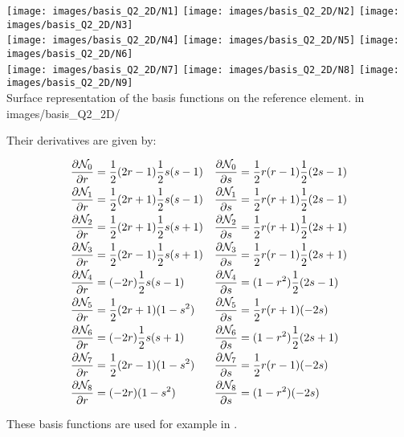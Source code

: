 \begin{center}
\texttt{[image: images/basis\_Q2\_2D/N1]}
\texttt{[image: images/basis\_Q2\_2D/N2]}
\texttt{[image: images/basis\_Q2\_2D/N3]}\\
\texttt{[image: images/basis\_Q2\_2D/N4]}
\texttt{[image: images/basis\_Q2\_2D/N5]}
\texttt{[image: images/basis\_Q2\_2D/N6]}\\
\texttt{[image: images/basis\_Q2\_2D/N7]}
\texttt{[image: images/basis\_Q2\_2D/N8]}
\texttt{[image: images/basis\_Q2\_2D/N9]}\\
{\captionfont Surface representation of the basis functions on the reference element.
{\color{gray} in images/basis\_Q2\_2D/ }}
\end{center}
Their derivatives are given by:
\begin{mdframed}[backgroundcolor=blue!5]
\begin{align}
\frac{\partial {\mathcal{N}}_0}{\partial r}&= \frac{1}{2}(2r-1)  \frac{1}{2}s(s-1) & 
\frac{\partial {\mathcal{N}}_0}{\partial s}&= \frac{1}{2}r(r-1)  \frac{1}{2}(2s-1)\nonumber\\
\frac{\partial {\mathcal{N}}_1}{\partial r}&= \frac{1}{2}(2r+1)  \frac{1}{2}s(s-1) &
\frac{\partial {\mathcal{N}}_1}{\partial s}&= \frac{1}{2}r(r+1)  \frac{1}{2}(2s-1)\nonumber\\
\frac{\partial {\mathcal{N}}_2}{\partial r}&= \frac{1}{2}(2r+1)  \frac{1}{2}s(s+1) &
\frac{\partial {\mathcal{N}}_2}{\partial s}&= \frac{1}{2}r(r+1)  \frac{1}{2}(2s+1)\nonumber\\
\frac{\partial {\mathcal{N}}_3}{\partial r}&= \frac{1}{2}(2r-1)  \frac{1}{2}s(s+1) &
\frac{\partial {\mathcal{N}}_3}{\partial s}&= \frac{1}{2}r(r-1)  \frac{1}{2}(2s+1)\nonumber\\
\frac{\partial {\mathcal{N}}_4}{\partial r}&=       (-2r)  \frac{1}{2}s(s-1) &
\frac{\partial {\mathcal{N}}_4}{\partial s}&=     (1-r^2)  \frac{1}{2}(2s-1)\nonumber\\
\frac{\partial {\mathcal{N}}_5}{\partial r}&= \frac{1}{2}(2r+1)     (1-s^2)&
\frac{\partial {\mathcal{N}}_5}{\partial s}&= \frac{1}{2}r(r+1)        (-2s)\nonumber\\
\frac{\partial {\mathcal{N}}_6}{\partial r}&=       (-2r)  \frac{1}{2}s(s+1)&
\frac{\partial {\mathcal{N}}_6}{\partial s}&=     (1-r^2)  \frac{1}{2}(2s+1)\nonumber\\
\frac{\partial {\mathcal{N}}_7}{\partial r}&= \frac{1}{2}(2r-1)     (1-s^2)&
\frac{\partial {\mathcal{N}}_7}{\partial s}&= \frac{1}{2}r(r-1)        (-2s)\nonumber\\
\frac{\partial {\mathcal{N}}_8}{\partial r}&=       (-2r)     (1-s^2)&
\frac{\partial {\mathcal{N}}_8}{\partial s}&=     (1-r^2)        (-2s)\nonumber
\end{align}
\end{mdframed}
These basis functions are used for example in .
